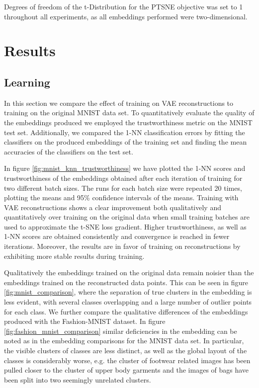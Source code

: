 Degrees of freedom of the t-Distribution for the PTSNE objective was set to 1 throughout all experiments, as all embeddings performed were two-dimensional.

\section{Results}
\label{section:results}

\subsection{Learning}
\label{subsection:learning}

In this section we compare the effect of training on VAE reconstructions to training on the original MNIST data set. To quantitatively evaluate the quality of the embeddings produced we employed the trustworthiness metric \cite{trustworthiness} on the MNIST test set. Additionally, we compared the 1-NN classification errors by fitting the classifiers on the produced embeddings of the training set and finding the mean accuracies of the classifiers on the test set.

In figure \ref{fig:mnist_knn_trustworthiness} we have plotted the 1-NN scores and trustworthiness of the embeddings obtained after each iteration of training for two different batch sizes. The runs for each batch size were repeated 20 times, plotting the means and 95\% confidence intervals of the means. Training with VAE reconstructions shows a clear improvement both qualitatively and quantitatively over training on the original data when small training batches are used to approximate the t-SNE loss gradient. Higher trustworthiness, as well as 1-NN scores are obtained consistently and convergence is reached in fewer iterations. Moreover, the results are in favor of training on reconstructions by exhibiting more stable results during training.

Qualitatively the embeddings trained on the original data remain noisier than the embeddings trained on the reconstructed data points. This can be seen in figure \ref{fig:mnist_comparison}, where the separation of true clusters in the embedding is less evident, with several classes overlapping and a large number of outlier points for each class. We further compare the qualitative differences of the embeddings produced with the Fashion-MNIST dataset. In figure \ref{fig:fashion_mnist_comparison} similar deficiencies in the embedding can be noted as in the embedding comparisons for the MNIST data set. In particular, the visible clusters of classes are less distinct, as well as the global layout of the classes is considerably worse, e.g. the cluster of footwear related images has been pulled closer to the cluster of upper body garments and the images of bags have been split into two seemingly unrelated clusters.

